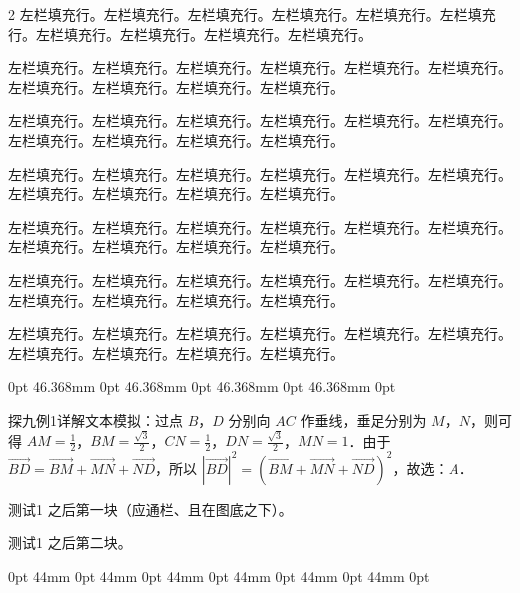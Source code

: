 \documentclass{ctexart}
\newcommand{\probeimg}[2]{%
  \textcolor{red!60}{\rule{#1mm}{#2mm}}}
\begin{document}
\begin{multicols}{2}
\noindent 左栏填充行。左栏填充行。左栏填充行。左栏填充行。左栏填充行。左栏填充行。左栏填充行。左栏填充行。左栏填充行。左栏填充行。\par
\noindent 左栏填充行。左栏填充行。左栏填充行。左栏填充行。左栏填充行。左栏填充行。左栏填充行。左栏填充行。左栏填充行。左栏填充行。\par
\noindent 左栏填充行。左栏填充行。左栏填充行。左栏填充行。左栏填充行。左栏填充行。左栏填充行。左栏填充行。左栏填充行。左栏填充行。\par
\noindent 左栏填充行。左栏填充行。左栏填充行。左栏填充行。左栏填充行。左栏填充行。左栏填充行。左栏填充行。左栏填充行。左栏填充行。\par
\noindent 左栏填充行。左栏填充行。左栏填充行。左栏填充行。左栏填充行。左栏填充行。左栏填充行。左栏填充行。左栏填充行。左栏填充行。\par
\noindent 左栏填充行。左栏填充行。左栏填充行。左栏填充行。左栏填充行。左栏填充行。左栏填充行。左栏填充行。左栏填充行。左栏填充行。\par
\noindent 左栏填充行。左栏填充行。左栏填充行。左栏填充行。左栏填充行。左栏填充行。左栏填充行。左栏填充行。左栏填充行。左栏填充行。\par
{ 0pt 46.368mm 0pt 46.368mm 0pt 46.368mm 0pt 46.368mm 0pt \linewidth
\raggedright
\noindent\smash{\rlap{\hspace{50.2mm}\raisebox{\dimexpr-\height+3.677mm\relax}[\dimexpr3.677mm\relax][\dimexpr\height-3.677mm\relax]{\probeimg{30}{22.5}}}}%
探九例1详解文本模拟：过点 \(B\)，\(D\) 分别向 \(AC\) 作垂线，垂足分别为 \(M\)，\(N\)，则可得 \(AM = \frac{1}{2}\)，\(BM = \frac{\sqrt{3}}{2}\)，\(CN = \frac{1}{2}\)，\(DN = \frac{\sqrt{3}}{2}\)，\(MN = 1\)．由于 \(\overrightarrow{BD} = \overrightarrow{BM} + \overrightarrow{MN} + \overrightarrow{ND}\)，所以 \(|\overrightarrow{BD}|^{2} = {(\overrightarrow{BM} + \overrightarrow{MN} + \overrightarrow{ND})}^{2}\)，故选：\emph{A}．\par}
\noindent 测试1 之后第一块（应通栏、且在图底之下）。\par
\noindent 测试1 之后第二块。\par
{ 0pt 44mm 0pt 44mm 0pt 44mm 0pt 44mm 0pt 44mm 0pt 44mm 0pt \linewidth
\raggedright
\noindent\smash{\rlap{\hspace{49mm}\raisebox{\dimexpr-\height+4.093mm\relax}[\dimexpr4.093mm\relax][\dimexpr\height-4.093mm\relax]{\probeimg{33.12}{17.8}}}}%
}
\end{multicols}
\end{document}
